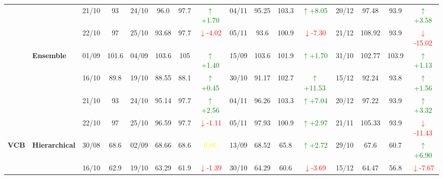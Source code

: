 \documentclass{ieeeaccess}
\begin{document}
{\begin{longtable}{llcc|cccc|cccc|cccc}
&
& 21/10 & 93 & 24/10 & 96.0 & 97.7 & \textcolor{green}{\(\uparrow\)+1.70} & 04/11 & 95.25 & 103.3 & \textcolor{green}{\(\uparrow\)+8.05} & 20/12 & 97.48 & 93.9 & \textcolor{green}{\(\uparrow\)+3.58} \\

&
& 22/10 & 97 & 25/10 & 93.68 & 97.7 & \textcolor{red}{\(\downarrow\)-4.02} & 05/11 & 93.6 & 100.9 & \textcolor{red}{\(\downarrow\)-7.30} & 21/12 & 108.92 & 93.9 & \textcolor{red}{\(\downarrow\)-15.02} \\
\cmidrule(lr){2-16}



& \textbf{Ensemble}
& 01/09 & 101.6 & 04/09 & 103.6 & 105 & \textcolor{green}{\(\uparrow\)+1.40} & 15/09 & 103.6 & 101.9 & \textcolor{green}{\(\uparrow\)+1.70} & 31/10 & 102.77 & 103.9 & \textcolor{green}{\(\uparrow\)+1.13} \\

&
& 16/10 & 89.8 & 19/10 & 88.55 & 88.1 & \textcolor{green}{\(\uparrow\)+0.45} & 30/10 & 91.17 & 102.7 & \textcolor{green}{\(\uparrow\)+11.53} & 15/12 & 92.24 & 93.8 & \textcolor{green}{\(\uparrow\)+1.56} \\

&
& 21/10 & 93 & 24/10 & 95.14 & 97.7 & \textcolor{green}{\(\uparrow\)+2.56} & 04/11 & 96.26 & 103.3 & \textcolor{green}{\(\uparrow\)+7.04} & 20/12 & 97.22 & 93.9 & \textcolor{green}{\(\uparrow\)+3.32} \\

&
& 22/10 & 97 & 25/10 & 96.59 & 97.7 & \textcolor{red}{\(\downarrow\)-1.11} & 05/11 & 97.93 & 100.9 & \textcolor{green}{\(\uparrow\)+2.97} & 21/11 & 105.33 & 93.9 & \textcolor{red}{\(\downarrow\)-11.43} \\
\midrule




\multirow{12}{*}{\textbf{VCB}} 
& \textbf{Hierarchical}
& 30/08 & 68.6 & 02/09 & 68.66 & 68.6 & \textcolor{yellow}{0.06} & 13/09 & 68.52 & 65.8 & \textcolor{green}{\(\uparrow\)+2.72} & 29/10 & 67.6 & 60.7 & \textcolor{green}{\(\uparrow\)+6.90} \\

&
& 16/10 & 62.9 & 19/10 & 63.29 & 61.9 & \textcolor{red}{\(\downarrow\)-1.39} & 30/10 & 64.29 & 60.6 & \textcolor{red}{\(\downarrow\)-3.69} & 15/12 & 64.47 & 56.8 & \textcolor{red}{\(\downarrow\)-7.67} \\


\end{longtable}}
\end{document}
